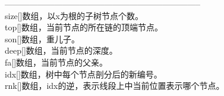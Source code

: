 ﻿-----------------------------------------------------------------------\\
size[]数组，以x为根的子树节点个数。\\
top[]数组，当前节点的所在链的顶端节点。\\
son[]数组，重儿子。\\
deep[]数组，当前节点的深度。\\
fa[]数组，当前节点的父亲。\\
idx[]数组，树中每个节点剖分后的新编号。\\
rnk[]数组，idx的逆，表示线段上中当前位置表示哪个节点。 
